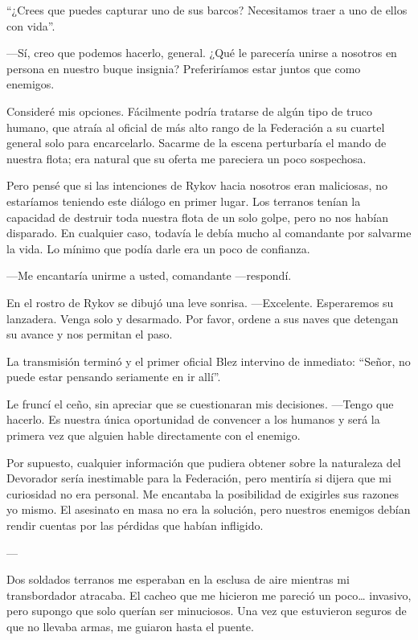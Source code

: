 “¿Crees que puedes capturar uno de sus barcos? Necesitamos traer a uno de ellos con vida”.

—Sí, creo que podemos hacerlo, general. ¿Qué le parecería unirse a nosotros en persona en nuestro buque insignia? Preferiríamos estar juntos que como enemigos.

Consideré mis opciones. Fácilmente podría tratarse de algún tipo de truco humano, que atraía al oficial de más alto rango de la Federación a su cuartel general solo para encarcelarlo. Sacarme de la escena perturbaría el mando de nuestra flota; era natural que su oferta me pareciera un poco sospechosa.

Pero pensé que si las intenciones de Rykov hacia nosotros eran maliciosas, no estaríamos teniendo este diálogo en primer lugar. Los terranos tenían la capacidad de destruir toda nuestra flota de un solo golpe, pero no nos habían disparado. En cualquier caso, todavía le debía mucho al comandante por salvarme la vida. Lo mínimo que podía darle era un poco de confianza.

—Me encantaría unirme a usted, comandante —respondí.

En el rostro de Rykov se dibujó una leve sonrisa. —Excelente. Esperaremos su lanzadera. Venga solo y desarmado. Por favor, ordene a sus naves que detengan su avance y nos permitan el paso.

La transmisión terminó y el primer oficial Blez intervino de inmediato: “Señor, no puede estar pensando seriamente en ir allí”.

Le fruncí el ceño, sin apreciar que se cuestionaran mis decisiones. —Tengo que hacerlo. Es nuestra única oportunidad de convencer a los humanos y será la primera vez que alguien hable directamente con el enemigo.

Por supuesto, cualquier información que pudiera obtener sobre la naturaleza del Devorador sería inestimable para la Federación, pero mentiría si dijera que mi curiosidad no era personal. Me encantaba la posibilidad de exigirles sus razones yo mismo. El asesinato en masa no era la solución, pero nuestros enemigos debían rendir cuentas por las pérdidas que habían infligido.

---

Dos soldados terranos me esperaban en la esclusa de aire mientras mi transbordador atracaba. El cacheo que me hicieron me pareció un poco… invasivo, pero supongo que solo querían ser minuciosos. Una vez que estuvieron seguros de que no llevaba armas, me guiaron hasta el puente.

